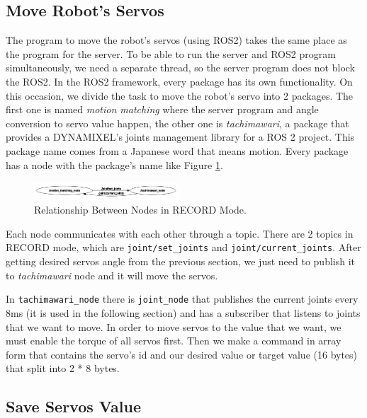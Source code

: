   \subsection{Move Robot's Servos}
  \label{subsec:move-robot-servo}
  
  The program to move the robot's servos (using ROS2) takes the same place as the program for the server. To be able to run the server and ROS2 program simultaneously, we need a separate thread, so the server program does not block the ROS2.
  In the ROS2 framework, every package has its own functionality. On this occasion, we divide the task to move the robot's servo into 2 packages. The first one is named \emph{motion matching} where the server program and angle conversion to servo value happen, the other one is \emph{tachimawari},
  a package that provides a DYNAMIXEL's joints management library for a ROS 2 project. This package name comes from a Japanese word that means motion. Every package has a node with the package's name like Figure \ref{fig:relation-node-record-mode}.
  \begin{figure}[ht]
    \centering
    \includegraphics[width=0.48\textwidth]{gambar/rqt_without_akushon.png}
    \caption{Relationship Between Nodes in RECORD Mode.}
    \label{fig:relation-node-record-mode}
  \end{figure}
  
  Each node communicates with each other through a topic. There are 2 topics in RECORD mode, which are \verb|joint/set_joints| and \verb|joint/current_joints|. 
  After getting desired servos angle from the previous section, we just need to publish it to \emph{tachimawari} node and it will move the servos. 

  In \verb|tachimawari_node| there is \verb|joint_node| that publishes the current joints every 8ms (it is used in the following section) and has a subscriber that listens to joints that we want to move. 
  In order to move servos to the value that we want, we must enable the torque of all servos first. Then we make a command in array form that contains the servo's id and our desired value or target value (16 bytes) that split into 2 * 8 bytes.

\subsection{Save Servos Value}
\label{subsec:save-servo-value}

